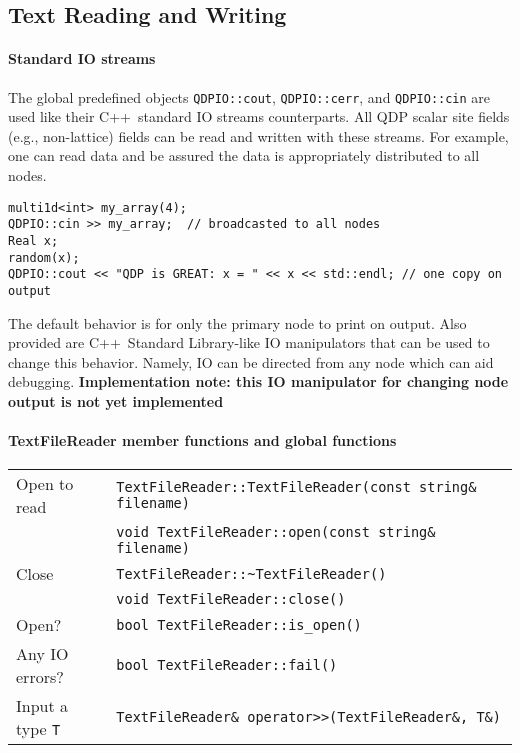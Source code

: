 \documentclass[12pt,letterpaper]{article}
\newcommand{\cpp}{C++}
\begin{document}
\subsection{Text Reading and Writing}
\label{sec:textio}

\paragraph{Standard IO streams}

The global predefined objects \verb|QDPIO::cout|, \verb|QDPIO::cerr|,
and \verb|QDPIO::cin| are used like their \cpp\ standard IO streams 
counterparts. All QDP scalar site fields (e.g., non-lattice) fields
can be read and written with these streams. For example, one can
read data and be assured the data is appropriately distributed to
all nodes.
%
\begin{small}
\begin{verbatim}
multi1d<int> my_array(4);
QDPIO::cin >> my_array;  // broadcasted to all nodes
Real x;
random(x);
QDPIO::cout << "QDP is GREAT: x = " << x << std::endl; // one copy on output
\end{verbatim}
\end{small}
%
The default behavior is for only the primary node to print on output.
Also provided are \cpp\ Standard Library-like IO manipulators that can 
be used to change this behavior. Namely, IO can be directed from any
node which can aid debugging.
{\bf Implementation note: this IO manipulator for changing node output is not yet implemented}


\paragraph{TextFileReader member functions and global functions}

\begin{flushleft}
  \begin{tabular}{|l|l|}
  \hline
  Open to read   & \verb|TextFileReader::TextFileReader(const string& filename)|\\
                 & \verb|void TextFileReader::open(const string& filename)|\\
  \hline
  Close          & \verb|TextFileReader::~TextFileReader()|\\
                 & \verb|void TextFileReader::close()|\\
  \hline
  Open?          & \verb|bool TextFileReader::is_open()| \\
  \hline
  Any IO errors? & \verb|bool TextFileReader::fail()| \\
  \hline
  Input a type \verb|T| & \verb|TextFileReader& operator>>(TextFileReader&, T&)| \\
  \hline
 \end{tabular}
\end{flushleft}
\end{document}
